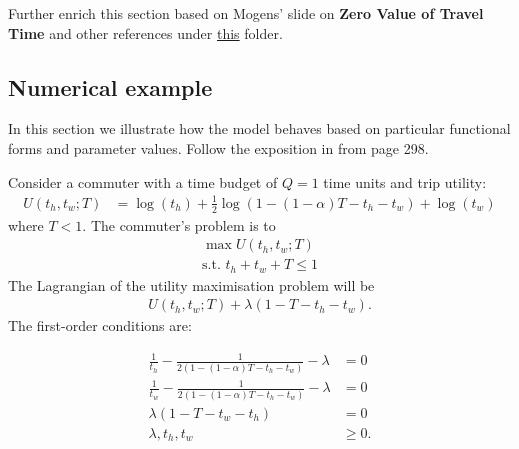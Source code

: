 \documentclass[12pt,a4paper,british]{article}
\begin{document}


 {\color{red}Further enrich this section based on Mogens' slide on \textbf{Zero Value of Travel Time} and other references under \href{C:/Users/deab/Dropbox/Postdoc/automation_scheduling}{this} folder.}


\subsection*{Numerical example}

In this section we illustrate how the model behaves based on particular functional forms and parameter values. Follow the exposition in \citet{FosgerauSmall2017EndogenousSchedulingPreferences} from page 298.

Consider a commuter with a time budget of $Q=1$ time units and trip utility:
\begin{align*}
U\left(t_{h},t_{w};T\right) & = \log\left(t_{h}\right) + \frac{1}{2} \log\left(1-\left(1-\alpha\right)T-t_{h}-t_{w}\right)+\log\left(t_{w}\right)
\end{align*}
where $T < 1$. The commuter's problem is to
\begin{gather*}
\max U\left(t_{h},t_{w};T\right)\\
\mbox{s.t. }t_{h}+t_{w}+T\leq 1
\end{gather*}
The Lagrangian of the utility maximisation problem will be
\begin{gather*}
U\left(t_{h},t_{w};T\right)+\lambda\left(1-T-t_{h}-t_{w}\right).
\end{gather*}
The first-order conditions are:

\begin{subequations}
\begin{align}
\frac{1}{t_{h}}-\frac{1}{2\left(1-\left(1-\alpha\right)T-t_{h}-t_{w}\right)}-\lambda & =0\\
\frac{1}{t_{w}} - \frac{1}{2\left(1-\left(1-\alpha\right)T - t_{h} - t_{w} \right)} - \lambda & = 0\\
\lambda\left(1-T-t_{w}-t_{h}\right) & =0\\
\lambda,t_{h},t_{w} & \geq 0.
\end{align}
\end{subequations}
\end{document}
